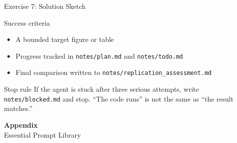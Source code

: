 \documentclass[aspectratio=169,10pt]{beamer}
\begin{document}
\begin{frame}{Exercise 7: Solution Sketch}
\small
\begin{exampleblock}{Success criteria}
\begin{itemize}\itemsep2pt
    \item A bounded target figure or table
    \item Progress tracked in \texttt{notes/plan.md} and \texttt{notes/todo.md}
    \item Final comparison written to \texttt{notes/replication\_assessment.md}
\end{itemize}
\end{exampleblock}

\begin{alertblock}{Stop rule}
If the agent is stuck after three serious attempts, write
\texttt{notes/blocked.md} and stop. ``The code runs'' is not the same as
``the result matches.''
\end{alertblock}
\end{frame}

\begin{frame}{}
\vfill\begin{center}{\Huge \textcolor{uzhblue}{\textbf{Appendix}}}\\[12pt]
{\LARGE Essential Prompt Library}\end{center}\vfill
\end{frame}
\end{document}
